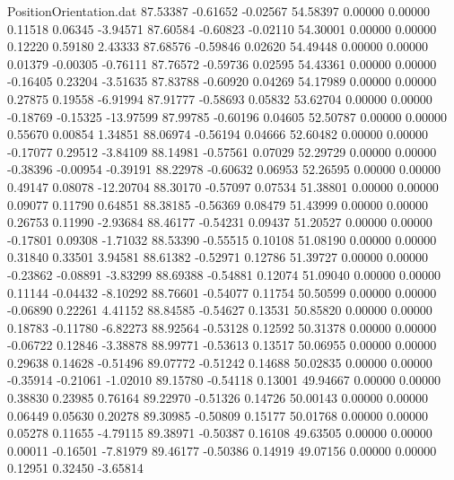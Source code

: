 \begin{filecontents}{PositionOrientation.dat}
  87.53387   -0.61652   -0.02567    54.58397    0.00000    0.00000    0.11518    0.06345   -3.94571
  87.60584   -0.60823   -0.02110    54.30001    0.00000    0.00000    0.12220    0.59180    2.43333
  87.68576   -0.59846    0.02620    54.49448    0.00000    0.00000    0.01379   -0.00305   -0.76111
  87.76572   -0.59736    0.02595    54.43361    0.00000    0.00000   -0.16405    0.23204   -3.51635
  87.83788   -0.60920    0.04269    54.17989    0.00000    0.00000    0.27875    0.19558   -6.91994
  87.91777   -0.58693    0.05832    53.62704    0.00000    0.00000   -0.18769   -0.15325  -13.97599
  87.99785   -0.60196    0.04605    52.50787    0.00000    0.00000    0.55670    0.00854    1.34851
  88.06974   -0.56194    0.04666    52.60482    0.00000    0.00000   -0.17077    0.29512   -3.84109
  88.14981   -0.57561    0.07029    52.29729    0.00000    0.00000   -0.38396   -0.00954   -0.39191
  88.22978   -0.60632    0.06953    52.26595    0.00000    0.00000    0.49147    0.08078  -12.20704
  88.30170   -0.57097    0.07534    51.38801    0.00000    0.00000    0.09077    0.11790    0.64851
  88.38185   -0.56369    0.08479    51.43999    0.00000    0.00000    0.26753    0.11990   -2.93684
  88.46177   -0.54231    0.09437    51.20527    0.00000    0.00000   -0.17801    0.09308   -1.71032
  88.53390   -0.55515    0.10108    51.08190    0.00000    0.00000    0.31840    0.33501    3.94581
  88.61382   -0.52971    0.12786    51.39727    0.00000    0.00000   -0.23862   -0.08891   -3.83299
  88.69388   -0.54881    0.12074    51.09040    0.00000    0.00000    0.11144   -0.04432   -8.10292
  88.76601   -0.54077    0.11754    50.50599    0.00000    0.00000   -0.06890    0.22261    4.41152
  88.84585   -0.54627    0.13531    50.85820    0.00000    0.00000    0.18783   -0.11780   -6.82273
  88.92564   -0.53128    0.12592    50.31378    0.00000    0.00000   -0.06722    0.12846   -3.38878
  88.99771   -0.53613    0.13517    50.06955    0.00000    0.00000    0.29638    0.14628   -0.51496
  89.07772   -0.51242    0.14688    50.02835    0.00000    0.00000   -0.35914   -0.21061   -1.02010
  89.15780   -0.54118    0.13001    49.94667    0.00000    0.00000    0.38830    0.23985    0.76164
  89.22970   -0.51326    0.14726    50.00143    0.00000    0.00000    0.06449    0.05630    0.20278
  89.30985   -0.50809    0.15177    50.01768    0.00000    0.00000    0.05278    0.11655   -4.79115
  89.38971   -0.50387    0.16108    49.63505    0.00000    0.00000    0.00011   -0.16501   -7.81979
  89.46177   -0.50386    0.14919    49.07156    0.00000    0.00000    0.12951    0.32450   -3.65814

\end{filecontents}
